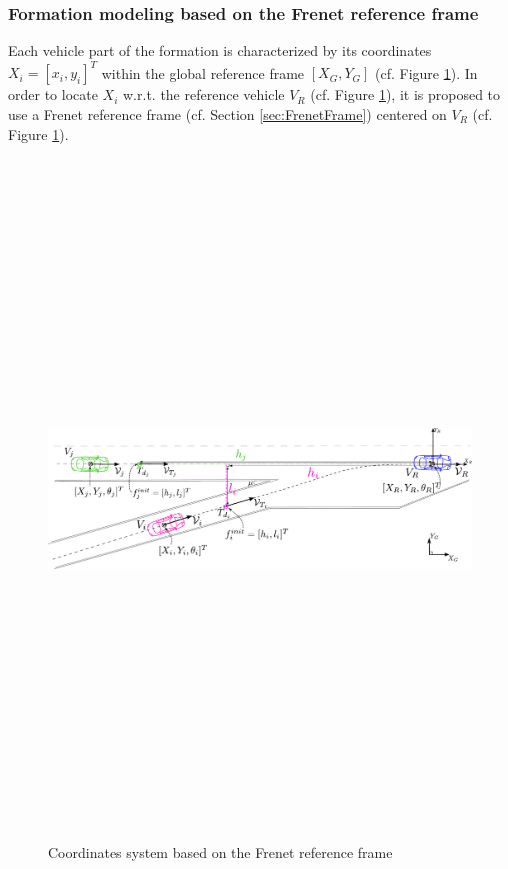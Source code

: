 \begin{itemize}
\subsubsection{Formation modeling based on the Frenet reference frame}
Each vehicle part of the formation is characterized by its coordinates $X_i=[x_i,y_i]^T$ within the global reference frame $[X_G,Y_G]$ (cf. Figure \ref{fig:Coordinates_system}). In order to locate $X_i$ w.r.t. the reference vehicle $V_R$ (cf. Figure \ref{fig:Coordinates_system}), it is proposed to use a Frenet reference frame (cf. Section \ref{sec:FrenetFrame}) centered on $V_R$ (cf. Figure \ref{fig:Coordinates_system}). 

       \begin{figure}[!h]
        \centering 
        \includegraphics[width=12.5cm,height=18cm,keepaspectratio]{chapters/Chapitre_5/Figures/ModelingScenarioSimple.pdf}
        \caption{Coordinates system based on the Frenet reference frame}
        \label{fig:Coordinates_system}
        \end{figure}




\end{itemize}
